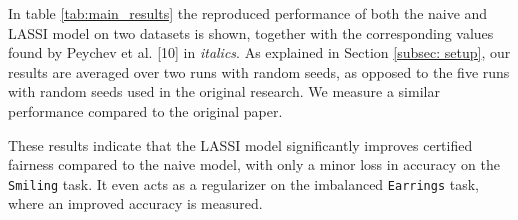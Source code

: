 In table \ref{tab:main_results} the reproduced performance of both the naive and LASSI model on two datasets is shown, together with the corresponding values found by Peychev et al. [10] in \textit{italics}. As explained in Section \ref{subsec: setup}, our results are averaged over two runs with random seeds, as opposed to the five runs with random seeds used in the original research. We measure a similar performance compared to the original paper. \newline

These results indicate that the LASSI model significantly improves certified fairness compared to the naive model, with only a minor loss in accuracy on the \texttt{Smiling} task. It even acts as a regularizer on the imbalanced \texttt{Earrings} task, where an improved accuracy is measured.





